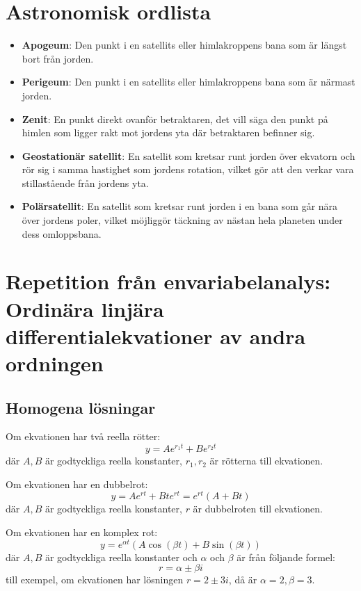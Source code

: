 \documentclass{article}
\newenvironment{ankiflashcard}[1]{}{}
\begin{document}
\begin{appendix}
\appendixpage
\section{Astronomisk ordlista}
\begin{itemize}
    \item \textbf{Apogeum}: Den punkt i en satellits eller himlakroppens bana som är längst bort från jorden.
    \item \textbf{Perigeum}: Den punkt i en satellits eller himlakroppens bana som är närmast jorden.
    \item \textbf{Zenit}: En punkt direkt ovanför betraktaren, det vill säga den punkt på himlen som ligger rakt mot jordens yta där betraktaren befinner sig.
    \item \textbf{Geostationär satellit}: En satellit som kretsar runt jorden över ekvatorn och rör sig i samma hastighet som jordens rotation, vilket gör att den verkar vara stillastående från jordens yta.
    \item \textbf{Polärsatellit}: En satellit som kretsar runt jorden i en bana som går nära över jordens poler, vilket möjliggör täckning av nästan hela planeten under dess omloppsbana.
\end{itemize}

\begin{ankiflashcard}{Repetera envariabeln: ange lösningarna till en typisk andra ordningens linjär homogen differentialekvation med konstanta koefficienter.}
\section*{Repetition från envariabelanalys: Ordinära linjära differentialekvationer av andra ordningen}

\subsection*{Homogena lösningar}

Om ekvationen har två reella rötter:
$$
y = Ae^{r_1t} + Be^{r_2t}
$$
där \( A, B \) är godtyckliga reella konstanter, \( r_1, r_2 \) är rötterna till ekvationen.

Om ekvationen har en dubbelrot:
$$
y = Ae^{rt} + Bte^{rt} = e^{rt}(A + Bt)
$$
där \( A, B \) är godtyckliga reella konstanter, \( r \) är dubbelroten till ekvationen.

Om ekvationen har en komplex rot:
$$
y = e^{\alpha t}(A\cos(\beta t) + B\sin(\beta t))
$$
där \( A, B \) är godtyckliga reella konstanter och \( \alpha \) och \( \beta \) är från följande formel:
$$
r = \alpha \pm \beta i
$$
till exempel, om ekvationen har lösningen \( r = 2 \pm 3i \), då är \( \alpha = 2, \beta = 3 \).


\end{ankiflashcard}
\end{appendix}
\end{document}
